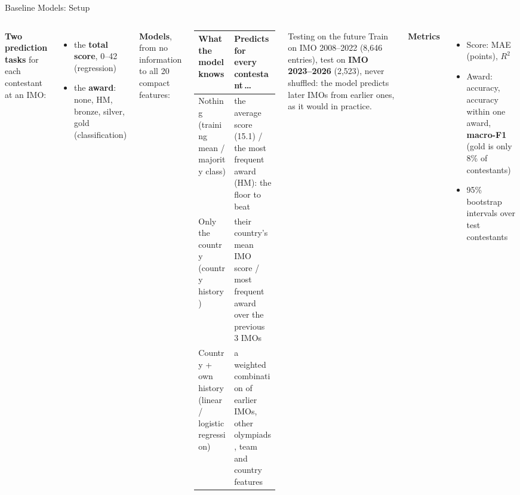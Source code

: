 \documentclass[aspectratio=169]{beamer}
\begin{document}
\begin{frame}{Baseline Models: Setup}
  \begin{columns}[T]
      \footnotesize
      \textbf{Two prediction tasks} for each contestant at an IMO:
      \begin{itemize}\setlength{\itemsep}{1pt}
        \item the \textbf{total score}, 0--42 (regression)
        \item the \textbf{award}: none, HM, bronze, silver, gold (classification)
      \end{itemize}

      \vspace{4pt}
      \textbf{Models}, from no information to all 20 compact features:

      \vspace{2pt}
      \scriptsize
      \setlength{\tabcolsep}{3pt}
      \begin{tabular}{L{2.6cm}L{5.0cm}}
        \toprule
        \textbf{What the model knows} & \textbf{Predicts for every contestant\,\dots} \\
        \midrule
        Nothing {\color{gray}(training mean / majority class)} & the average score (15.1) / the most
                                          frequent award (HM): the floor to beat \\[2pt]
        Only the country {\color{gray}(country history)} & their country's mean IMO score / most
                                          frequent award over the previous 3 IMOs \\[2pt]
        Country + own history {\color{gray}(linear / logistic regression)} & a weighted combination of earlier IMOs,
                                          other olympiads, team and country features \\
        \bottomrule
      \end{tabular}

      \begin{block}{Testing on the future}
        \footnotesize Train on IMO 2008--2022 (8,646 entries), test on
        \textbf{IMO 2023--2026} (2,523), never shuffled: the model predicts later
        IMOs from earlier ones, as it would in practice.
      \end{block}

      \vspace{6pt}
      \footnotesize
      \textbf{Metrics}
      \begin{itemize}\setlength{\itemsep}{2pt}
        \item Score: MAE (points), $R^2$
        \item Award: accuracy, accuracy within one award, \textbf{macro-F1}
              (gold is only 8\% of contestants)
        \item 95\% bootstrap intervals over test contestants
      \end{itemize}
  \end{columns}
\end{frame}
\end{document}
